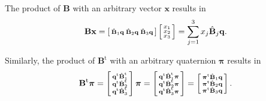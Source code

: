 \documentclass[aip,jcp,reprint,amsmath,amssymb]{revtex4-1}
\makeatletter
\newcommand{\mt}[1]{\boldsymbol{\mathbf{#1}}}           %
\newcommand{\vt}[1]{\boldsymbol{\mathbf{#1}}}           %
\newcommand{\tr}[1]{#1^\text{t}}                        %
\newenvironment{smallarray}[1]                          %
{\null\,\vcenter\bgroup\scriptsize
	\renewcommand{\arraystretch}{0.7}
	\arraycolsep=.13885em
	\hbox\bgroup$\array{@{}#1@{}}}
{\endarray$\egroup\egroup\,\null}
\makeatother
\begin{document}
The product of $\mt B$ with an arbitrary vector $\vt x$ results in
\begin{equation}
\label{eq:product_B_vector}
\mt B \vt x = \left[ \begin{smallarray}{ccc} \hat{\mt B}_1 \vt q & \hat{\mt B}_2 \vt q & \hat{\mt B}_3 \vt q \end{smallarray}\right] \left[ \begin{smallarray}{c} x_1 \\ x_2 \\ x_3 \end{smallarray} \right] = \sum_{j=1}^3 x_j \hat{\mt B}_j \vt q.
\end{equation}

Similarly, the product of $\tr{\mt B}$ with an arbitrary quaternion $\vt \pi$ results in
\begin{equation}
\label{eq:vector_entries}
\tr{\mt B}\vt \pi =
\left[\begin{smallarray}{c}
\tr{\vt q}\tr{\hat{\mt B}}_1 \\
\tr{\vt q}\tr{\hat{\mt B}}_2 \\
\tr{\vt q}\tr{\hat{\mt B}}_3 \\
\end{smallarray}\right]\vt \pi = 
\left[\begin{smallarray}{c}
\tr{\vt q}\tr{\hat{\mt B}}_1\vt \pi \\
\tr{\vt q}\tr{\hat{\mt B}}_2\vt \pi \\
\tr{\vt q}\tr{\hat{\mt B}}_3\vt \pi \\
\end{smallarray}\right] = 
\left[\begin{smallarray}{c}
\tr{\vt \pi}{\hat{\mt B}}_1\vt q \\
\tr{\vt \pi}{\hat{\mt B}}_2\vt q \\
\tr{\vt \pi}{\hat{\mt B}}_3\vt q \\
\end{smallarray}\right].
\end{equation}
\end{document}
